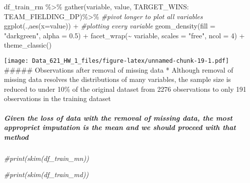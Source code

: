 \documentclass[
]{article}
\newenvironment{Shaded}{\begin{snugshade}}{\end{snugshade}}
\newcommand{\AttributeTok}[1]{\textcolor[rgb]{0.77,0.63,0.00}{#1}}
\newcommand{\CommentTok}[1]{\textcolor[rgb]{0.56,0.35,0.01}{\textit{#1}}}
\newcommand{\DecValTok}[1]{\textcolor[rgb]{0.00,0.00,0.81}{#1}}
\newcommand{\FloatTok}[1]{\textcolor[rgb]{0.00,0.00,0.81}{#1}}
\newcommand{\FunctionTok}[1]{\textcolor[rgb]{0.00,0.00,0.00}{#1}}
\newcommand{\NormalTok}[1]{#1}
\newcommand{\SpecialCharTok}[1]{\textcolor[rgb]{0.00,0.00,0.00}{#1}}
\newcommand{\StringTok}[1]{\textcolor[rgb]{0.31,0.60,0.02}{#1}}
\begin{document}
\begin{Shaded}
\begin{Highlighting}[]
\NormalTok{df\_train\_rm }\SpecialCharTok{\%\textgreater{}\%} 
  \FunctionTok{gather}\NormalTok{(variable, value, TARGET\_WINS}\SpecialCharTok{:}\NormalTok{ TEAM\_FIELDING\_DP)}\SpecialCharTok{\%\textgreater{}\%} \CommentTok{\#pivot longer to plot all variables}
  \FunctionTok{ggplot}\NormalTok{(.,}\FunctionTok{aes}\NormalTok{(}\AttributeTok{x=}\NormalTok{value)) }\SpecialCharTok{+} \CommentTok{\#plotting every variable}
  \FunctionTok{geom\_density}\NormalTok{(}\AttributeTok{fill =} \StringTok{"darkgreen"}\NormalTok{, }\AttributeTok{alpha =} \FloatTok{0.5}\NormalTok{) }\SpecialCharTok{+}
  \FunctionTok{facet\_wrap}\NormalTok{(}\SpecialCharTok{\textasciitilde{}}\NormalTok{ variable, }\AttributeTok{scales =} \StringTok{"free"}\NormalTok{, }\AttributeTok{ncol =} \DecValTok{4}\NormalTok{) }\SpecialCharTok{+}
  \FunctionTok{theme\_classic}\NormalTok{()}
\end{Highlighting}
\end{Shaded}

\texttt{[image: Data\_621\_HW\_1\_files/figure-latex/unnamed-chunk-19-1.pdf]}
\#\#\#\#\# Observations after removal of missing data * Although removal
of missing data resolves the distributions of many variables, the sample
size is reduced to under 10\% of the original dataset from 2276
observations to only 191 observations in the training dataset

\hypertarget{given-the-loss-of-data-with-the-removal-of-missing-data-the-most-appropriet-imputation-is-the-mean-and-we-should-proceed-with-that-method}{%
\subparagraph{Given the loss of data with the removal of missing data,
the most appropriet imputation is the mean and we should proceed with
that
method}\label{given-the-loss-of-data-with-the-removal-of-missing-data-the-most-appropriet-imputation-is-the-mean-and-we-should-proceed-with-that-method}}

\begin{Shaded}
\begin{Highlighting}[]
\CommentTok{\#print(skim(df\_train\_mn))}
\end{Highlighting}
\end{Shaded}

\begin{Shaded}
\begin{Highlighting}[]
\CommentTok{\#print(skim(df\_train\_md))}
\end{Highlighting}
\end{Shaded}
\end{document}
